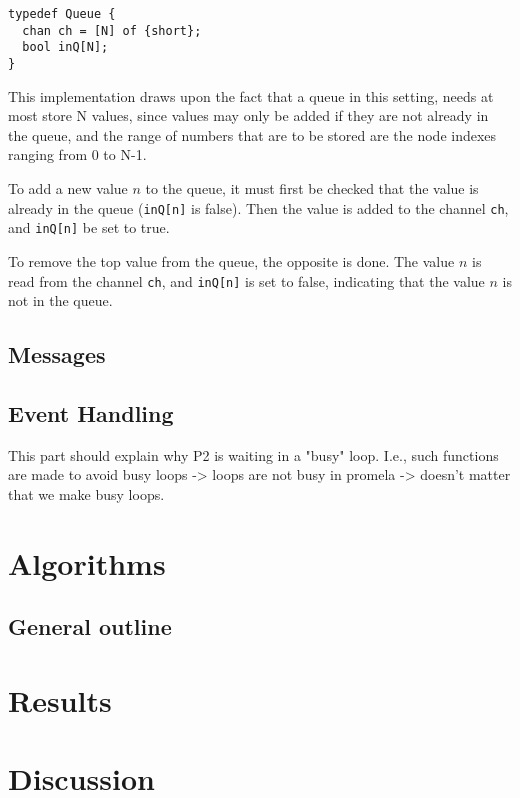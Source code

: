 \documentclass[a4paper,12pt]{article}
\begin{document}
\begin{lstlisting}
typedef Queue {
  chan ch = [N] of {short};
  bool inQ[N];
}
\end{lstlisting}

This implementation draws upon the fact that a queue in this setting, needs at most store N values, since values may only be added if they are not already in the queue, and the range of numbers that are to be stored are the node indexes ranging from 0 to N-1.

To add a new value $n$ to the queue, it must first be checked that the value is already in the queue (\texttt{inQ[n]} is false). Then the value is added to the channel \texttt{ch}, and \texttt{inQ[n]} be set to true.

To remove the top value from the queue, the opposite is done. The value $n$ is read from the channel \texttt{ch}, and \texttt{inQ[n]} is set to false, indicating that the value $n$ is not in the queue.

\subsection{Messages}


\subsection{Event Handling}
This part should explain why P2 is waiting in a "busy" loop. I.e., such functions are made to avoid busy loops -> loops are not busy in promela -> doesn't matter that we make busy loops.

\section{Algorithms}

\subsection{General outline}

\section{Results}


\section{Discussion}
\end{document}
